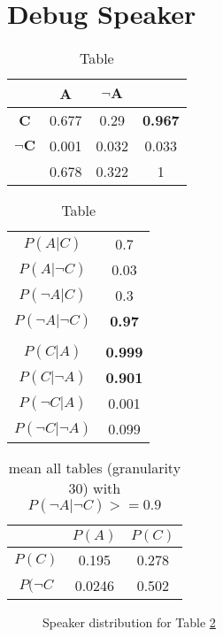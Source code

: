 \documentclass[10pt,a4paper]{article}
\author{Britta Grusdt}
\begin{document}
\section*{Debug Speaker}
\begin{table}[h]
\begin{tabular}{c|cc|c}
		   			& \textbf{A} & $\boldsymbol{\neg A}$ & \\\hline
\textbf{C} 			& 0.677 & 0.29 & \textbf{0.967} \\
$\boldsymbol{\neg C}$	& 0.001 & 0.032 & 0.033 \\ \hline
					& 0.678 & 0.322 & 1
\end{tabular}
\qquad
\begin{tabular}{c|c}
$P(A|C)$ & 0.7 \\
$P(A|\neg C)$ & 0.03\\
$P(\neg A|C)$ & 0.3\\
$P(\neg A|\neg C)$ & \textbf{0.97}\\
& \\\hline
$P(C|A)$ & \textbf{0.999}\\
$P(C|\neg A)$ & \textbf{0.901}\\
$P(\neg C|A)$ & 0.001\\
$P(\neg C|\neg A)$ & 0.099
\end{tabular}
\caption{Table}
\label{table:speakerBad}
\end{table}
\vspace{1cm}

\begin{table}[h]
\centering
\begin{tabular}{c|c|c} 
           & $P(A)$ & $P(C)$ \\ \hline 
$P(C)$     &  0.195 & 0.278 \\ 
$P(\neg C$ &  0.0246 & 0.502
\end{tabular}
\caption{mean all tables (granularity 30) with $P(\neg A|\neg C)>=0.9$}
\end{table}

\begin{figure}[htp!]
\centering
\subfloat[]{\label{fig:speakerbad}}
\caption{Speaker distribution for Table \ref{table:speakerBad}}
\end{figure}

\FloatBarrier
\newpage
\end{document}
